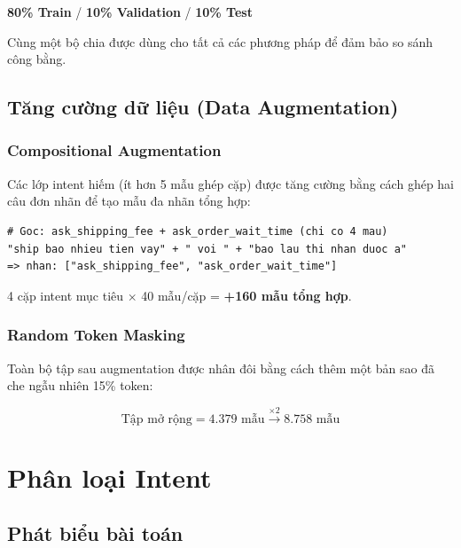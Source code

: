 \documentclass[12pt, a4paper]{report}
\begin{document}
\begin{center}
\textbf{80\% Train} / \textbf{10\% Validation} / \textbf{10\% Test}
\end{center}

Cùng một bộ chia được dùng cho tất cả các phương pháp
để đảm bảo so sánh công bằng.

\section{Tăng cường dữ liệu (Data Augmentation)}

\subsection{Compositional Augmentation}

Các lớp intent hiếm (ít hơn 5 mẫu ghép cặp) được tăng cường bằng
cách ghép hai câu đơn nhãn để tạo mẫu đa nhãn tổng hợp:

\begin{lstlisting}[caption={Ví dụ Compositional Augmentation}]
# Goc: ask_shipping_fee + ask_order_wait_time (chi co 4 mau)
"ship bao nhieu tien vay" + " voi " + "bao lau thi nhan duoc a"
=> nhan: ["ask_shipping_fee", "ask_order_wait_time"]
\end{lstlisting}

4 cặp intent mục tiêu $\times$ 40 mẫu/cặp = \textbf{+160 mẫu tổng hợp}.

\subsection{Random Token Masking}

Toàn bộ tập sau augmentation được nhân đôi bằng cách thêm
một bản sao đã che ngẫu nhiên 15\% token:

\begin{equation}
  \text{Tập mở rộng} = 4.379 \text{ mẫu} \xrightarrow{\times 2} 8.758 \text{ mẫu}
\end{equation}

\chapter{Phân loại Intent}

\section{Phát biểu bài toán}
\end{document}

